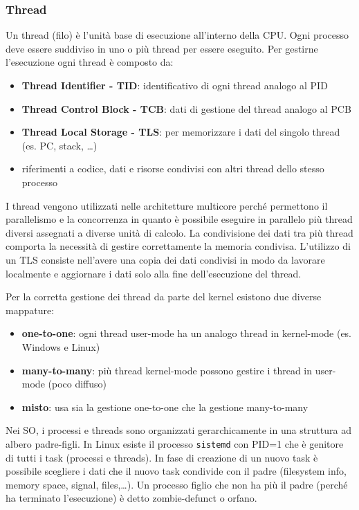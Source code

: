 \documentclass[a4paper]{article}
\begin{document}
\subsubsection*{Thread}
Un thread (filo) è l'unità base di esecuzione all'interno della CPU. Ogni processo deve essere suddiviso in uno o più thread per
essere eseguito. Per gestirne l'esecuzione ogni thread è composto da:
\begin{itemize}
	\item \textbf{Thread Identifier - TID}: identificativo di ogni thread analogo al PID
	\item \textbf{Thread Control Block - TCB}: dati di gestione del thread analogo al PCB
	\item \textbf{Thread Local Storage - TLS}: per memorizzare i dati del singolo thread (es. PC, stack, \dots)
	\item riferimenti a codice, dati e risorse condivisi con altri thread dello stesso processo
\end{itemize}
I thread vengono utilizzati nelle architetture multicore perché permettono il parallelismo e la concorrenza in quanto è possibile
eseguire in parallelo più thread diversi assegnati a diverse unità di calcolo. La condivisione dei dati tra più thread comporta
la necessità di gestire correttamente la memoria condivisa. L'utilizzo di un TLS consiste nell'avere una copia dei dati condivisi
in modo da lavorare localmente e aggiornare i dati solo alla fine dell'esecuzione del thread.

Per la corretta gestione dei thread da parte del kernel esistono due diverse mappature:
\begin{itemize}
	\item \textbf{one-to-one}: ogni thread user-mode ha un analogo thread in kernel-mode (es. Windows e Linux)
	\item \textbf{many-to-many}: più thread kernel-mode possono gestire i thread in user-mode (poco diffuso)
	\item \textbf{misto}: usa sia la gestione one-to-one che la gestione many-to-many
\end{itemize}

Nei SO, i processi e threads sono organizzati gerarchicamente in una struttura ad albero padre-figli. In Linux esiste il processo
\verb|sistemd| con PID=1 che è genitore di tutti i task (processi e threads). In fase di creazione di un nuovo task è possibile 
scegliere i dati che il nuovo task condivide con il padre (filesystem info, memory space, signal, files,\dots). Un processo figlio
che non ha più il padre (perché ha terminato l'esecuzione) è detto zombie-defunct o orfano.
\end{document}
